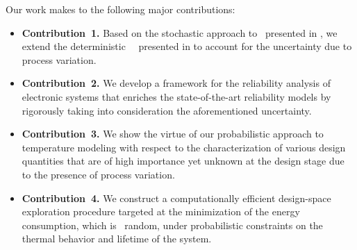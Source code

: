 Our work makes to the following major contributions:
\begin{itemize}
  \item {\bfseries Contribution~1.} Based on the stochastic approach to \tta\ presented in \cite{ukhov2014}, we extend the deterministic \DSS\ \ta\ presented in \cite{ukhov2012} to account for the uncertainty due to process variation.
  \item {\bfseries Contribution~2.} We develop a framework for the reliability analysis of electronic systems that enriches the state-of-the-art reliability models by rigorously taking into consideration the aforementioned uncertainty.
  \item {\bfseries Contribution~3.} We show the virtue of our probabilistic approach to temperature modeling with respect to the characterization of various design quantities that are of high importance yet unknown at the design stage due to the presence of process variation.
  \item {\bfseries Contribution~4.} We construct a computationally efficient design-space exploration procedure targeted at the minimization of the energy consumption, which is \apriori\ random, under probabilistic constraints on the thermal behavior and lifetime of the system.
\end{itemize}
